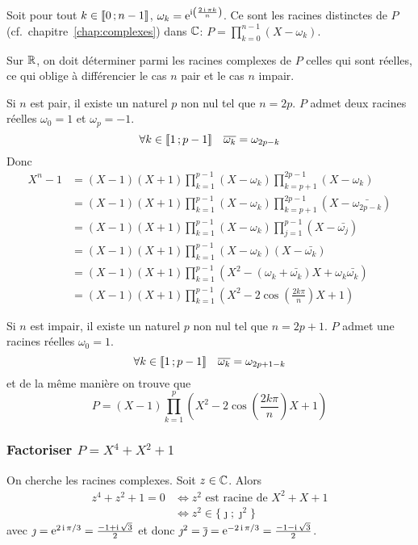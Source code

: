 Soit pour tout \(k \in \mathopen{\llbracket}0\mathclose{}\mathpunct{};n-1\mathclose{\rrbracket}\), \(\omega_k = 
\operatorname{e}^{\operatorname{i}\left(\frac{2\operatorname{i} \pi k}{n}\right)}\). Ce sont les racines distinctes de 
\(P\) (cf.\ chapitre~\ref{chap:complexes}) dans \(\mathbb{C}\): \(P = \prod_{k = 0}^{n-1}(X-\omega_k)\).

Sur \(\mathbb{R}\), on doit déterminer parmi les racines complexes de \(P\) celles qui 
sont réelles, ce qui oblige à différencier le cas \(n\) pair et le cas \(n\) 
impair.

Si \(n\) est pair, il existe un naturel \(p\) non nul tel que \(n = 2p\). \(P\) 
admet deux racines réelles \(\omega_0 = 1\) et \(\omega_p = -1\).
\begin{equation}
  \forall k \in \mathopen{\llbracket}1\mathclose{}\mathpunct{};p-1\mathclose{\rrbracket} \quad \overline{\omega_k} = \omega_{2p-k}
\end{equation}
Donc
\begin{align}
  X^n-1 &= (X-1)(X+1) \prod_{k = 1}^{p-1} (X-\omega_k)\prod_{k = p+1}^{2p-1} 
  (X-\omega_k) \\
  & = (X-1)(X+1) \prod_{k = 1}^{p-1} (X-\omega_k) \prod_{k = p+1}^{2p-1} 
  (X-\bar{\omega_{2p-k}})\\
  & = (X-1)(X+1) \prod_{k = 1}^{p-1} (X-\omega_k) \prod_{j = 1}^{p-1} 
  (X-\bar{\omega_{j}})\\
  & = (X-1)(X+1) \prod_{k = 1}^{p-1} (X-\omega_k)(X-\bar{\omega_{k}})\\
  & = (X-1)(X+1) \prod_{k = 1}^{p-1} 
  (X^2-(\omega_k+\bar{\omega_k})X+\omega_k\bar{\omega_k})\\
  & = (X-1)(X+1) \prod_{k = 1}^{p-1} 
  \left(X^2-2\cos\left(\frac{2k\pi}{n}\right)X+1\right)
\end{align}

Si \(n\) est impair, il existe un naturel \(p\) non nul tel que \(n = 2p+1\). 
\(P\) admet une racines réelles \(\omega_0 = 1\).
\begin{equation}
  \forall k \in \mathopen{\llbracket}1\mathclose{}\mathpunct{};p-1\mathclose{\rrbracket} \quad \overline{\omega_k} = \omega_{2p+1-k}
\end{equation}
et de la même manière on trouve que
\begin{equation}
  P = (X-1) \prod_{k = 1}^{p} \left(X^2-2\cos\left(\frac{2k\pi}{n}\right)X+1\right)
\end{equation}

\subsubsection{Factoriser \(P = X^4+X^2+1\)}

On cherche les racines complexes. Soit \(z \in \mathbb{C}\). Alors
\begin{align}
  z^4+z^2+1 = 0 &\iff z^2 \text{~est racine de~} X^2+X+1 \\
  &\iff z^2 \in \{\jmath ; \jmath^2\}
\end{align}
avec \(\jmath = \operatorname{e}^{2\operatorname{i}\pi/3} = \frac{-1+\operatorname{i}\sqrt{3}}{2}\) et donc 
\(\jmath^2 = \overline{\jmath} = \operatorname{e}^{-2\operatorname{i}\pi/3} = \frac{-1-\operatorname{i}\sqrt{3}}{2}\). 


